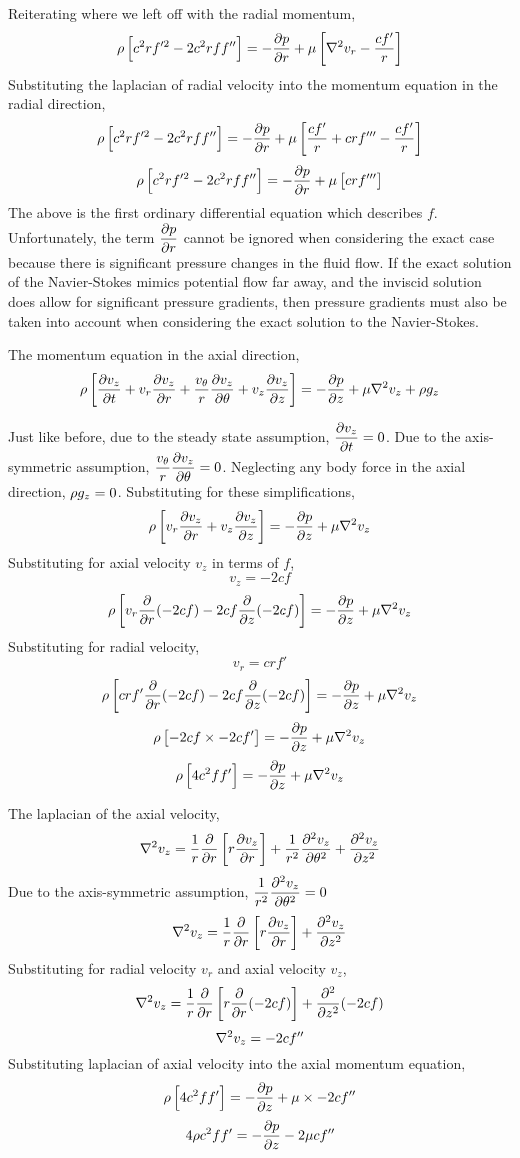 \documentclass[a4paper, 12pt]{report}
\begin{document}
\begin{center}
Reiterating where we left off with the radial momentum,
$$\rho\left[c^2rf'^2 - 2c^2rff''\right] = -\frac{\partial p}{\partial r} + \mu\left[\nabla^2v_r - \frac{cf'}{r}\right]$$
Substituting the laplacian of radial velocity into the momentum equation in the radial direction,
$$\rho\left[c^2rf'^2 - 2c^2rff''\right] = -\frac{\partial p}{\partial r} + \mu\left[\frac{cf'}{r} + crf''' - \frac{cf'}{r}\right]$$
$$\rho\left[c^2rf'^2 - 2c^2rff''\right] = -\frac{\partial p}{\partial r} + \mu\left[crf'''\right]$$ %
The above is the first ordinary differential equation which describes $f$. Unfortunately, the term $\displaystyle{\frac{\partial p}{\partial r}}$ cannot be ignored when considering the exact case because there is significant pressure changes in the fluid flow. If the exact solution of the Navier-Stokes mimics potential flow far away, and the inviscid solution does allow for significant pressure gradients, then pressure gradients must also be taken into account when considering the exact solution to the Navier-Stokes. 



The momentum equation in the axial direction,
$$\rho\left[\frac{\partial v_z}{\partial t} + v_r\frac{\partial v_z}{\partial r} + \frac{v_\theta}{r}\frac{\partial v_z}{\partial \theta} + v_z\frac{\partial v_z}{\partial z}\right] = - \frac{\partial p}{\partial z} + \mu\nabla^2v_z + \rho g_z$$

Just like before, due to the steady state assumption, $\displaystyle{\frac{\partial v_z}{\partial t}=0}$. Due to the axis-symmetric assumption, $\displaystyle{\frac{v_\theta}{r}\frac{\partial v_z}{\partial\theta}=0}$. Neglecting any body force in the axial direction, $\displaystyle{\rho g_z=0}$. Substituting for these simplifications,
$$\rho\left[ v_r\frac{\partial v_z}{\partial r} + v_z\frac{\partial v_z}{\partial z}\right] = - \frac{\partial p}{\partial z} + \mu\nabla^2v_z$$
Substituting for axial velocity $v_z$ in terms of $f$,
$$v_z = -2cf$$
$$\rho\left[ v_r\frac{\partial }{\partial r}(-2cf) - 2cf\frac{\partial }{\partial z}(-2cf)\right] = - \frac{\partial p}{\partial z} + \mu\nabla^2v_z$$
Substituting for radial velocity,
$$v_r =  crf'$$
$$\rho\left[ crf'\frac{\partial }{\partial r}(-2cf) - 2cf\frac{\partial }{\partial z}(-2cf)\right] = - \frac{\partial p}{\partial z} + \mu\nabla^2v_z$$
$$\rho\left[ - 2cf\times -2cf'\right] = - \frac{\partial p}{\partial z} + \mu\nabla^2v_z$$
$$\rho\left[4c^2ff'\right] = - \frac{\partial p}{\partial z} + \mu\nabla^2v_z$$

The laplacian of the axial velocity,
$$\nabla^2 v_z = \frac{1}{r}\frac{\partial }{\partial r}\left[r\frac{\partial v_z}{\partial r}\right] + \frac{1}{r^2}\frac{\partial^2 v_z}{\partial \theta^2} + \frac{\partial^2 v_z}{\partial z^2}$$
Due to the axis-symmetric assumption, $\displaystyle{\frac{1}{r^2}\frac{\partial^2 v_z}{\partial\theta^2}=0}$
$$\nabla^2 v_z = \frac{1}{r}\frac{\partial }{\partial r}\left[r\frac{\partial v_z}{\partial r}\right] + \frac{\partial^2 v_z}{\partial z^2}$$
Substituting for radial velocity $v_r$ and axial velocity $v_z$,
$$\nabla^2 v_z = \frac{1}{r}\frac{\partial }{\partial r}\left[r\frac{\partial }{\partial r}(-2cf)\right] + \frac{\partial^2 }{\partial z^2}(-2cf)$$
$$\nabla^2 v_z =  -2cf''$$
Substituting laplacian of axial velocity into the axial momentum equation,
$$\rho\left[4c^2ff'\right] = - \frac{\partial p}{\partial z} + \mu\times-2cf''$$
$$4\rho c^2ff' = - \frac{\partial p}{\partial z} - 2\mu cf''$$ %


\end{center}
\end{document}
